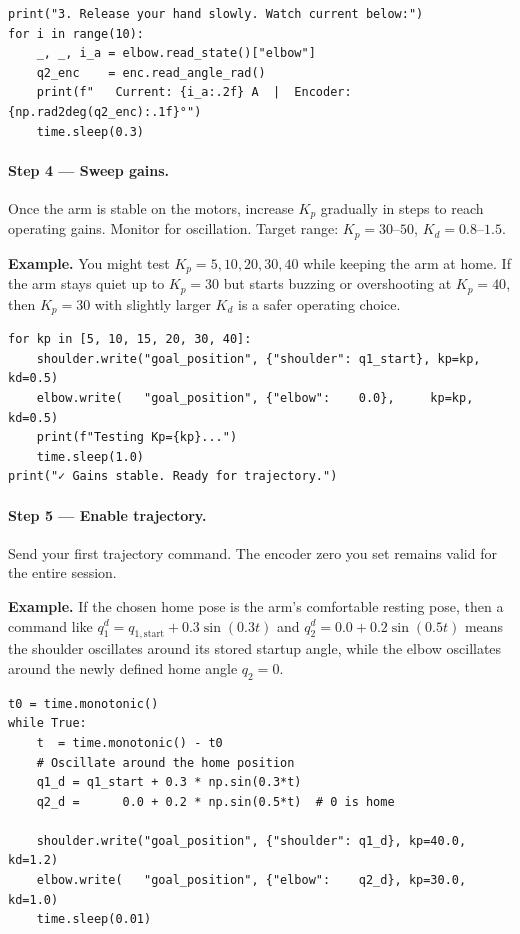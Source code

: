 \documentclass[11pt,a4paper]{article}
\begin{document}
\begin{lstlisting}[caption={Monitor current while releasing.}]
print("3. Release your hand slowly. Watch current below:")
for i in range(10):
    _, _, i_a = elbow.read_state()["elbow"]
    q2_enc    = enc.read_angle_rad()
    print(f"   Current: {i_a:.2f} A  |  Encoder: {np.rad2deg(q2_enc):.1f}°")
    time.sleep(0.3)
\end{lstlisting}

\paragraph{Step 4 --- Sweep gains.}
Once the arm is stable on the motors, increase $K_p$ gradually in steps to reach
operating gains.  Monitor for oscillation.
Target range: $K_p = 30$--$50$, $K_d = 0.8$--$1.5$.

\textbf{Example.}
You might test $K_p = 5, 10, 20, 30, 40$ while keeping the arm at home.
If the arm stays quiet up to $K_p = 30$ but starts buzzing or overshooting at $K_p = 40$,
then $K_p = 30$ with slightly larger $K_d$ is a safer operating choice.
\begin{lstlisting}[caption={Ramp up gains from 5 to 40.}]
for kp in [5, 10, 15, 20, 30, 40]:
    shoulder.write("goal_position", {"shoulder": q1_start}, kp=kp, kd=0.5)
    elbow.write(   "goal_position", {"elbow":    0.0},     kp=kp, kd=0.5)
    print(f"Testing Kp={kp}...")
    time.sleep(1.0)
print("✓ Gains stable. Ready for trajectory.")
\end{lstlisting}

\paragraph{Step 5 --- Enable trajectory.}
Send your first trajectory command.  The encoder zero you set remains valid for the
entire session.

\textbf{Example.}
If the chosen home pose is the arm's comfortable resting pose, then a command like
$q_1^d = q_{1,\mathrm{start}} + 0.3\sin(0.3t)$ and $q_2^d = 0.0 + 0.2\sin(0.5t)$
means the shoulder oscillates around its stored startup angle, while the elbow oscillates
around the newly defined home angle $q_2 = 0$.
\begin{lstlisting}[caption={Send trajectory (example: sine wave).}]
t0 = time.monotonic()
while True:
    t  = time.monotonic() - t0
    # Oscillate around the home position
    q1_d = q1_start + 0.3 * np.sin(0.3*t)
    q2_d =      0.0 + 0.2 * np.sin(0.5*t)  # 0 is home
    
    shoulder.write("goal_position", {"shoulder": q1_d}, kp=40.0, kd=1.2)
    elbow.write(   "goal_position", {"elbow":    q2_d}, kp=30.0, kd=1.0)
    time.sleep(0.01)
\end{lstlisting}
\end{document}
